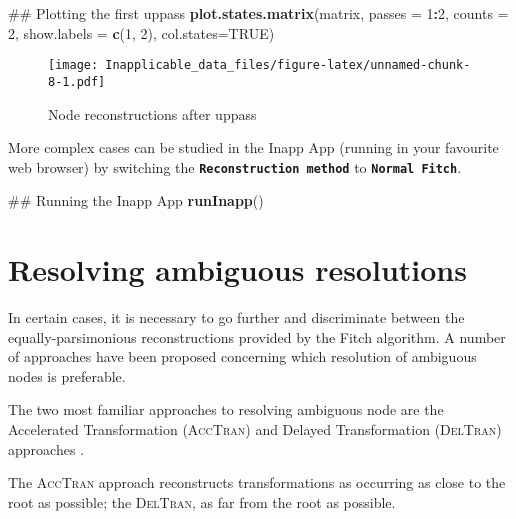 \documentclass[]{book}
\newenvironment{Shaded}{\begin{snugshade}}{\end{snugshade}}
\newcommand{\KeywordTok}[1]{\textcolor[rgb]{0.13,0.29,0.53}{\textbf{#1}}}
\newcommand{\DataTypeTok}[1]{\textcolor[rgb]{0.13,0.29,0.53}{#1}}
\newcommand{\DecValTok}[1]{\textcolor[rgb]{0.00,0.00,0.81}{#1}}
\newcommand{\OtherTok}[1]{\textcolor[rgb]{0.56,0.35,0.01}{#1}}
\newcommand{\OperatorTok}[1]{\textcolor[rgb]{0.81,0.36,0.00}{\textbf{#1}}}
\newcommand{\NormalTok}[1]{#1}
\theoremstyle{definition}
\theoremstyle{definition}
\theoremstyle{definition}
\theoremstyle{remark}
\begin{document}
\begin{Shaded}
\begin{Highlighting}[]
\NormalTok{## Plotting the first uppass}
\KeywordTok{plot.states.matrix}\NormalTok{(matrix, }\DataTypeTok{passes =} \DecValTok{1}\OperatorTok{:}\DecValTok{2}\NormalTok{, }\DataTypeTok{counts =} \DecValTok{2}\NormalTok{,}
                   \DataTypeTok{show.labels =} \KeywordTok{c}\NormalTok{(}\DecValTok{1}\NormalTok{, }\DecValTok{2}\NormalTok{), }\DataTypeTok{col.states=}\OtherTok{TRUE}\NormalTok{)}
\end{Highlighting}
\end{Shaded}

\begin{figure}
\centering
\texttt{[image: Inapplicable\_data\_files/figure-latex/unnamed-chunk-8-1.pdf]}
\caption{\label{fig:unnamed-chunk-8}Node reconstructions after uppass}
\end{figure}

More complex cases can be studied in the Inapp App (running in your
favourite web browser) by switching the
\textbf{\texttt{Reconstruction\ method}} to
\textbf{\texttt{Normal\ Fitch}}.

\begin{Shaded}
\begin{Highlighting}[]
\NormalTok{## Running the Inapp App}
\KeywordTok{runInapp}\NormalTok{()}
\end{Highlighting}
\end{Shaded}

\hypertarget{resolving-ambiguous-resolutions}{%
\section{Resolving ambiguous
resolutions}\label{resolving-ambiguous-resolutions}}

In certain cases, it is necessary to go further and discriminate between
the equally-parsimonious reconstructions provided by the Fitch
algorithm. A number of approaches have been proposed concerning which
resolution of ambiguous nodes is preferable.

The two most familiar approaches to resolving ambiguous node are the
Accelerated Transformation (\textsc{AccTran}) and Delayed Transformation
(\textsc{DelTran}) approaches \citep{Farris1970, Swofford1987}.

The \textsc{AccTran} approach reconstructs transformations as occurring
as close to the root as possible; the \textsc{DelTran}, as far from the
root as possible.
\end{document}
